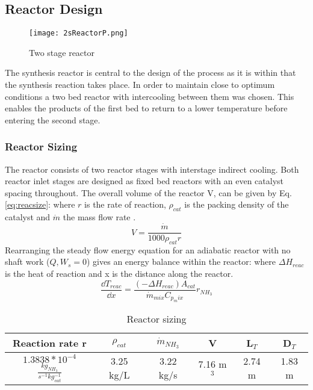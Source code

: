 \subsection{Reactor Design}
\begin{wrapfigure}{r}{0.41\textwidth}
		\centering
		\texttt{[image: 2sReactorP.png]}
		\caption{Two stage reactor}
\end{wrapfigure}

The synthesis reactor is central to the design of the process as it is within that the synthesis reaction takes place. In order to maintain close to optimum conditions  a two bed reactor with intercooling between them was chosen. This enables the products of the first bed to return to a lower temperature before entering the second stage.

\subsubsection{Reactor Sizing}
The reactor consists of two reactor stages with interstage indirect cooling. Both reactor inlet stages are designed as fixed bed reactors with an even catalyst spacing throughout. The overall volume of the reactor V, can be given by Eq. \ref{eq:reacsize}: where $r$ is the rate of reaction, $\rho_{cat}$ is the packing density of the catalyst and $\dot{m}$ the mass flow rate \cite{Banares-alcantara2014}.
\begin{equation}
\label{eq:reacsize}
	V = \frac{\dot{m}}{1000\rho_{cat}r}
\end{equation}
Rearranging the steady flow energy equation for an adiabatic reactor with no shaft work ($Q,W_s=0$) gives an energy balance within the reactor: where $\Delta H_{reac}$ is the heat of reaction and x is the distance along the reactor.
\begin{equation}
\frac{\dd T_{reac}}{\dd x} = \frac{(-\Delta H_{reac})A_{cat}}{\dot{m}_{mix}C_{p_mix}}r_{NH_3}
\end{equation}
\begin{table}[!htbp]
	\begin{center}
		\label{tab:reacreq}
		\caption{Reactor sizing}
		
		\begin{tabular}{|c|c|c|c|c|c|}
			\hline
			Reaction rate r& $\rho_{cat}$ & $\dot{m}_{NH_3}$ & V  & L$_T$ & D$_T$ \\ \hline
			$1.3838*10^{-4}$ $\frac{kg_{NH_3}}{s^{-1}kg_{cat}^{-1}}$       & 3.25 kg/L         & 3.22 kg/s                      & 7.16 m$^3$ & 2.74 m & 1.83 m \\ \hline
		\end{tabular}
		
	\end{center}
\end{table}

